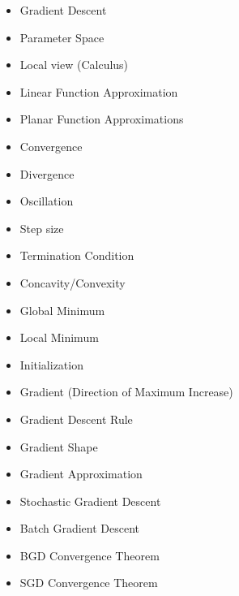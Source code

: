     \begin{itemize}
        \item Gradient Descent
        \item Parameter Space
        \item Local view (Calculus)
        \item Linear Function Approximation
        \item Planar Function Approximations
        \item Convergence
        \item Divergence
        \item Oscillation
        \item Step size
        \item Termination Condition
        \item Concavity/Convexity
        \item Global Minimum
        \item Local Minimum
        \item Initialization
        \item Gradient (Direction of Maximum Increase)
        \item Gradient Descent Rule
        \item Gradient Shape
        \item Gradient Approximation
        \item Stochastic Gradient Descent
        \item Batch Gradient Descent
        \item BGD Convergence Theorem
        \item SGD Convergence Theorem
    \end{itemize}